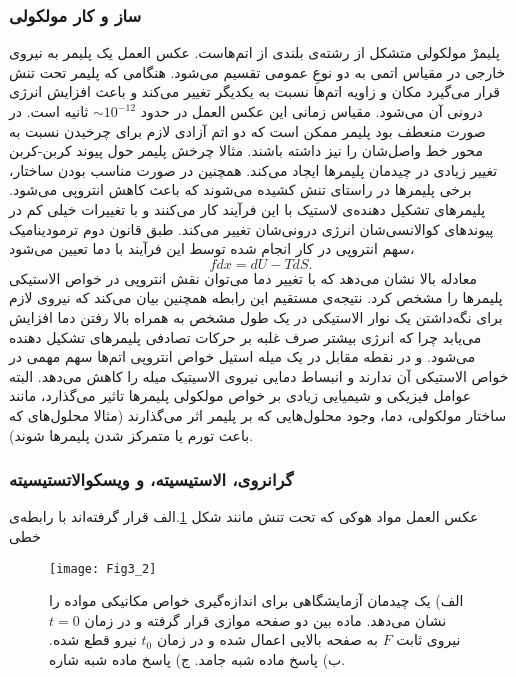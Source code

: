 \subsubsection{ساز و کار مولکولی}
پلیمرْ مولکولی متشکل از رشته‌ی بلندی از اتم‌هاست. عکس العمل یک پلیمر به نیروی خارجی در مقیاس اتمی به دو نوعِ عمومی تقسیم می‌شود. هنگامی که پلیمر تحت تنش قرار می‌گیرد مکان و زاویه اتم‌ها  نسبت به یکدیگر تغییر می‌کند و باعث افزایش انرژی درونی‌ آن می‌شود. مقیاس زمانی این عکس العمل در حدود $\sim10^{-12}$ ثانیه است. در صورت منعطف بود پلیمر  ممکن است که دو اتم آزادی لازم برای چرخیدن نسبت به محور خط واصل‌شان را نیز داشته باشند. مثالا چرخش پلیمر حول پیوند‌ کربن-کربن تغییر زیادی در چیدمان پلیمر‌ها ایجاد می‌کند. همچنین در صورت مناسب بودن ساختار، برخی پلیمر‌ها در راستای تنش کشیده می‌شوند که باعث کاهش انتروپی  می‌شود. پلیمر‌های تشکیل دهنده‌ی لاستیک‌ با این فرآیند کار می‌کنند و با تغییرات خیلی کم در پیوند‌های کوالانسی‌شان انرژی درونی‌شان تغییر می‌کند. طبق قانون دوم ترمودینامیک سهم انتروپی در کار انجام شده توسط این فرآیند با دما تعیین می‌شود،
\begin{equation}
fdx=dU-TdS.\label{eq:second_thermo}
\end{equation}
معادله بالا نشان می‌دهد که با تغییر دما می‌توان نقش انتروپی در خواص الاستیکی پلیمر‌ها را مشخص کرد. نتیجه‌ی مستقیم این رابطه همچنین بیان می‌کند که نیروی لازم برای نگه‌داشتن یک نوار الاستیکی در یک طول مشخص به همراه بالا رفتن دما افزایش می‌یابد چرا که انرژی بیشتر صرف غلبه بر حرکات تصادفی پلیمر‌های تشکیل دهنده می‌شود. و در نقطه مقابل در یک میله استیل خواص انتروپی اتم‌ها سهم مهمی در خواص الاستیکی آن ندارند و انبساط دمایی نیروی الاسیتیک میله را کاهش می‌دهد.
البته عوامل فیزیکی و شیمیایی زیادی بر خواص مولکولی پلیمر‌ها تاثیر می‌گذارد، مانند ساختار مولکولی، دما، وجود محلول‌هایی که بر پلیمر اثر ‌می‌گذارند (مثالا محلول‌های که باعث تورم یا متمرکز شدن پلیمر‌ها شوند).  
\subsubsection{گرانروی، الاستیسیته،  و ویسکوالاتستیسیته}
عکس العمل مواد هوکی که تحت تنش مانند شکل \ref{fig:3.2}.الف قرار گرفته‌اند  با رابطه‌ی خطی 
\begin{figure}[htbp]
\begin{center}
\texttt{[image: Fig3\_2]}
\caption{
الف) یک چیدمان آزمایشگاهی برای اندازه‌گیری خواص مکانیکی مواده را نشان می‌دهد. ماده بین دو صفحه موازی قرار گرفته و در زمان $t=0$  نیروی ثابت $F$ به صفحه بالایی اعمال شده و در زمان $t_0$ نیرو قطع شده‌. ب) پاسخ ماده شبه جامد. ج) پاسخ ماده شبه شاره.
}
\label{fig:3.2}
\end{center}
\end{figure}


